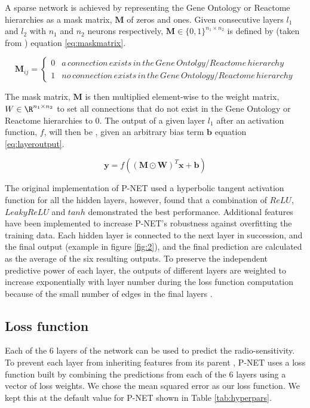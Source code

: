 \documentclass[NOTE, disdraft=true, UKenglish]{\DISCDTLATEXPATH UCLCDTDISdoc}
\begin{document}
A sparse network is achieved by representing the Gene Ontology or Reactome hierarchies as a mask matrix, $\textbf{M}$ of zeros and ones. Given consecutive layers $l_{1}$ and $l_{2}$ with $n_1$ and $n_2$ neurons respectively, $\textbf{M} \in \{0, 1\}^{n_1 \times n_2}$ is defined by (taken from \cite{cosmin_thesis}) equation \ref{eq:maskmatrix}.

\begin{equation}
    \textbf{M}_{ij} = \left\{ \begin{array}{rcl}
0 & a\,connection\, exists\, in\, the\, Gene\, Ontolgy/Reactome \, hierarchy \\ 1 & no \, connection \, exists \, in \, the \, Gene \, Ontology/Reactome \, hierarchy \end{array}\right.
\label{eq:maskmatrix}
\end{equation}

The mask matrix, $\textbf{M}$ is then multiplied element-wise to the weight matrix, $W \in \R^{n_1 \times n_2}$ to set all connections that do not exist in the Gene Ontology or Reactome hierarchies to $0$. The output of a given layer $l_1$ after an activation function, $f$, will then be \cite{elmarakeby_biologically_2021}, given an arbitrary bias term $\textbf{b}$ equation \ref{eq:layeroutput}.

\begin{equation}
    \textbf{y} = f((\textbf{M} \odot \textbf{W})^T\textbf{x} + \textbf{b})
    \label{eq:layeroutput}
\end{equation}

The original implementation of P-NET \cite{elmarakeby_biologically_2021} used a hyperbolic tangent activation function for all the hidden layers, however, \cite{cosmin_thesis} found that a combination of $ReLU$, $Leaky ReLU$ and $tanh$ demonstrated the best performance. Additional features have been implemented to increase P-NET's robustness against overfitting the training data. Each hidden layer is connected to the next layer in succession, and the final output (example in figure \ref{fig:2}), and the final prediction are calculated as the average of the six resulting outputs. To preserve the independent predictive power of each layer, the outputs of different layers are weighted to increase exponentially with layer number during the loss function computation because of the small number of edges in the final layers \cite{cosmin_thesis}.

\subsection{Loss function}
Each of the 6 layers of the network can be used to predict the radio-sensitivity. To prevent each layer from inheriting features from its parent \cite{cosmin_thesis}, P-NET uses a loss function built by combining the predictions from each of the 6 layers using a vector of loss weights.  We chose the mean squared error as our loss function.
We kept this at the default value for P-NET shown in Table \ref{tab:hyperpars}.
\end{document}
